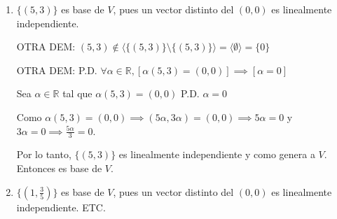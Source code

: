 \begin{enumerate}
\begin{enumerate}
        \begin{enumerate}
            \item $\{(5, 3)\}$ es base de $V$, pues un vector distinto del $(0, 0)$ es linealmente independiente.
            
            OTRA DEM: $(5, 3) \notin \langle\{(5, 3)\} \setminus \{(5, 3)\}\rangle = \langle\emptyset\rangle = \{0\}$
            
            OTRA DEM: P.D. $\forall \alpha \in \mathbb{R}, [\alpha(5, 3) = (0, 0)] \implies [\alpha = 0]$
            
            Sea $\alpha \in \mathbb{R}$ tal que $\alpha(5, 3) = (0, 0)$
            P.D. $\alpha = 0$
            
            Como $\alpha(5, 3) = (0, 0) \implies (5\alpha, 3\alpha) = (0, 0) \implies 5\alpha = 0$ y $3\alpha = 0 \implies \frac{5\alpha}{3} = 0$.
            
            Por lo tanto, $\{(5, 3)\}$ es linealmente independiente y como genera a $V$. Entonces es base de $V$.
            
            \item $\{(1, \frac{3}{5})\}$ es base de $V$, pues un vector distinto del $(0, 0)$ es linealmente independiente. ETC.
        \end{enumerate}
    \end{enumerate}
\end{enumerate}

